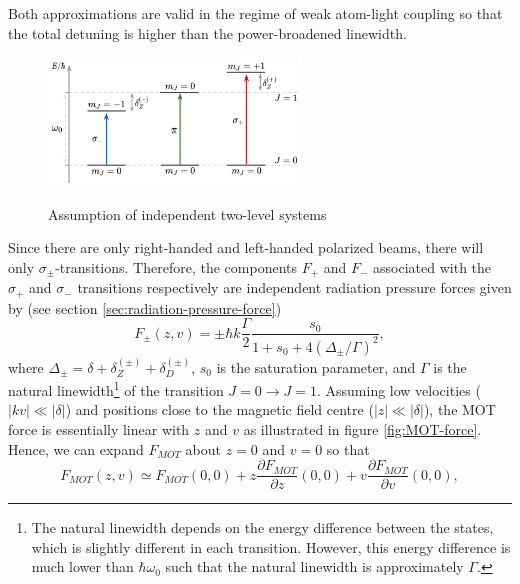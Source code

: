 Both approximations are valid in the regime of weak atom-light coupling so that the total detuning is higher than the power-broadened linewidth.

\begin{figure}[!ht]
	\centering
	\caption{Assumption of independent two-level systems}
	\includegraphics[width=0.6\textwidth]{USPSC-img/Independent-two-level-system.png}
	\label{fig:independent-two-level-system}
\end{figure}

Since there are only right-handed and left-handed polarized beams, there will only $ \sigma_{\pm} $-transitions. Therefore, the components $ F_{+} $ and $ F_{-} $ associated with the $ \sigma_{+} $ and $ \sigma_{-} $ transitions respectively are independent radiation pressure forces given by (see section \ref{sec:radiation-pressure-force})
\begin{equation}
	F_{\pm}(z, v) = \pm \hbar k \frac{\Gamma}{2} \frac{s_0}{1 + s_0 + 4(\Delta_{\pm} / \Gamma)^2},
	\label{eq:1D-MOT-force-components}
\end{equation}
where $ \Delta_{\pm} = \delta + \delta_{Z}^{(\pm)} + \delta_{D}^{(\pm)} $, $ s_0 $ is the saturation parameter, and $ \Gamma $ is the natural linewidth\footnote{The natural linewidth depends on the energy difference between the states, which is slightly different in each transition. However, this energy difference is much lower than $ \hbar \omega_0 $ such that the natural linewidth is approximately $ \Gamma $.} of the transition $ J = 0 \rightarrow J = 1 $. Assuming low velocities ($ |kv| \ll |\delta| $) and positions close to the magnetic field centre ($ |z| \ll |\delta| $), the MOT force is essentially linear with $ z $ and $ v $ as illustrated in figure \ref{fig:MOT-force}. Hence, we can expand $ F_{MOT} $ about $ z = 0 $ and $ v = 0 $ so that
\begin{equation}
	F_{MOT}(z, v) \simeq F_{MOT}(0, 0) + z \frac{\partial F_{MOT}}{\partial z}(0, 0) + v \frac{\partial F_{MOT}}{\partial v}(0, 0),
	\label{eq:MOT-force-Taylor-expansion}
\end{equation}

